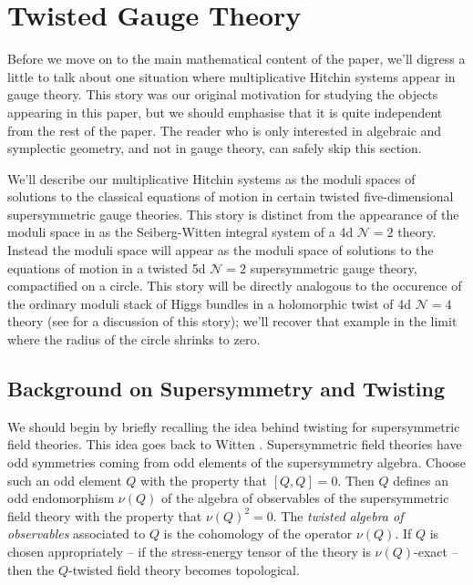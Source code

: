 \documentclass[11pt, oneside, reqno]{amsart}
\theoremstyle{definition} \newtheorem{definition}{Definition}[section]
\theoremstyle{definition} \newtheorem{remark}[definition]{Remark}
\theoremstyle{definition} \newtheorem{remarks}[definition]{Remarks}
\theoremstyle{definition} \newtheorem{question}[definition]{Question}
\theoremstyle{definition} \newtheorem*{note}{Note}
\theoremstyle{definition} \newtheorem{example}[definition]{Example}
\theoremstyle{definition} \newtheorem{examples}[definition]{Examples}
\newcommand{\mc}[1]{\mathcal{#1}}
\begin{document}
\section{Twisted Gauge Theory} \label{twist_section}
Before we move on to the main mathematical content of the paper, we'll digress a little to talk about one situation where multiplicative Hitchin systems appear in gauge theory.  This story was our original motivation for studying the objects appearing in this paper, but we should emphasise that it is quite independent from the rest of the paper.  The reader who is only interested in algebraic and symplectic geometry, and not in gauge theory, can safely skip this section.

We'll describe our multiplicative Hitchin systems as the moduli spaces of solutions to the classical equations of motion in certain twisted five-dimensional supersymmetric gauge theories.  This story is distinct from the appearance of the moduli space in \cite{NekrasovPestun} as the Seiberg-Witten integral system of a 4d $\mc N=2$ theory.  Instead the moduli space will appear as the moduli space of solutions to the equations of motion in a twisted 5d $\mc N=2$ supersymmetric gauge theory, compactified on a circle.  This story will be directly analogous to the occurence of the ordinary moduli stack of Higgs bundles in a holomorphic twist of 4d $\mc N=4$ theory (see \cite{CostelloSH,ElliottYoo1} for a discussion of this story); we'll recover that example in the limit where the radius of the circle shrinks to zero.

\subsection{Background on Supersymmetry and Twisting}

We should begin by briefly recalling the idea behind twisting for supersymmetric field theories.  This idea goes back to Witten \cite{WittenTQFT}.  Supersymmetric field theories have odd symmetries coming from odd elements of the supersymmetry algebra.  Choose such an odd element $Q$ with the property that $[Q,Q]=0$.  Then $Q$ defines an odd endomorphism $\nu(Q)$ of the algebra of observables of the supersymmetric field theory with the property that $\nu(Q)^2 = 0$.  The \emph{twisted algebra of observables} associated to $Q$ is the cohomology of the operator $\nu(Q)$.  If $Q$ is chosen appropriately -- if the stress-energy tensor of the theory is $\nu(Q)$-exact -- then the $Q$-twisted field theory becomes topological.
\end{document}
